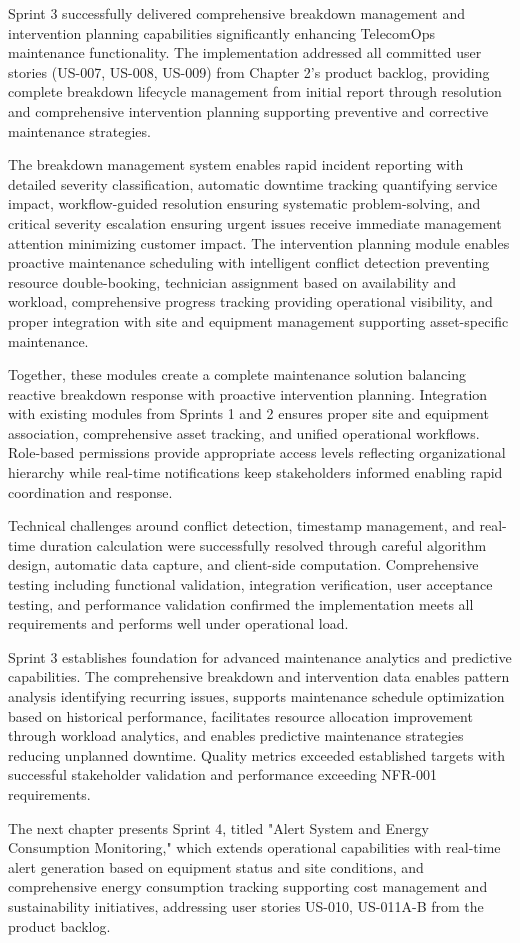 Sprint 3 successfully delivered comprehensive breakdown management and intervention planning capabilities significantly enhancing TelecomOps maintenance functionality. The implementation addressed all committed user stories (US-007, US-008, US-009) from Chapter 2's product backlog, providing complete breakdown lifecycle management from initial report through resolution and comprehensive intervention planning supporting preventive and corrective maintenance strategies.

The breakdown management system enables rapid incident reporting with detailed severity classification, automatic downtime tracking quantifying service impact, workflow-guided resolution ensuring systematic problem-solving, and critical severity escalation ensuring urgent issues receive immediate management attention minimizing customer impact. The intervention planning module enables proactive maintenance scheduling with intelligent conflict detection preventing resource double-booking, technician assignment based on availability and workload, comprehensive progress tracking providing operational visibility, and proper integration with site and equipment management supporting asset-specific maintenance.

Together, these modules create a complete maintenance solution balancing reactive breakdown response with proactive intervention planning. Integration with existing modules from Sprints 1 and 2 ensures proper site and equipment association, comprehensive asset tracking, and unified operational workflows. Role-based permissions provide appropriate access levels reflecting organizational hierarchy while real-time notifications keep stakeholders informed enabling rapid coordination and response.

Technical challenges around conflict detection, timestamp management, and real-time duration calculation were successfully resolved through careful algorithm design, automatic data capture, and client-side computation. Comprehensive testing including functional validation, integration verification, user acceptance testing, and performance validation confirmed the implementation meets all requirements and performs well under operational load.

Sprint 3 establishes foundation for advanced maintenance analytics and predictive capabilities. The comprehensive breakdown and intervention data enables pattern analysis identifying recurring issues, supports maintenance schedule optimization based on historical performance, facilitates resource allocation improvement through workload analytics, and enables predictive maintenance strategies reducing unplanned downtime. Quality metrics exceeded established targets with successful stakeholder validation and performance exceeding NFR-001 requirements.

The next chapter presents Sprint 4, titled "Alert System and Energy Consumption Monitoring," which extends operational capabilities with real-time alert generation based on equipment status and site conditions, and comprehensive energy consumption tracking supporting cost management and sustainability initiatives, addressing user stories US-010, US-011A-B from the product backlog.